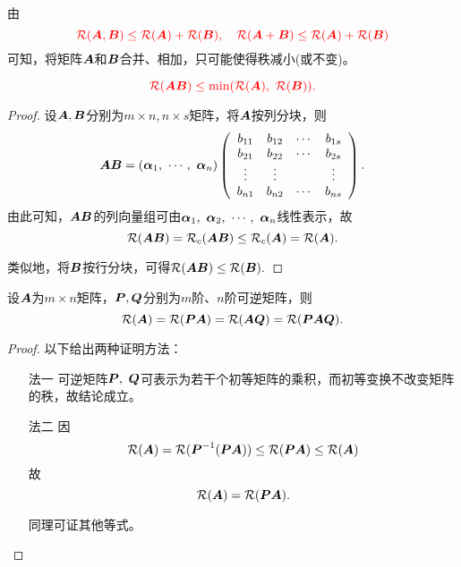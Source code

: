 \begin{frame}
\begin{zhu}
  由
  $$
  \red{\rank(\MA,\MB)\le \rank(\MA)+\rank(\MB), \quad
  \rank(\MA+\MB) \le \rank(\MA)+\rank(\MB)}
  $$
  可知，将矩阵$\MA$和$\MB$合并、相加，只可能使得秩减小(或不变)。
\end{zhu}

\end{frame}

\begin{frame}
\begin{xingzhi}
  $$
  \red{\rank(\MA\MB) \le \min(\rank(\MA),~\rank(\MB)).}
  $$
\end{xingzhi}
\pause 
\begin{proof}
设$\MA,\MB$分别为$m\times n, n\times s$矩阵，将$\MA$按列分块，则
$$
\MA\MB = (\alphabd_1,~\cd,~\alphabd_n) \left(
  \begin{array}{cccc}
    b_{11}&b_{12}&\cd&b_{1s}\\
    b_{21}&b_{22}&\cd&b_{2s}\\
    \vd&\vd&&\vd\\
    b_{n1}&b_{n2}&\cd&b_{ns}
  \end{array}
\right).
$$  
由此可知，$\MA\MB$的列向量组可由$\alphabd_1,~\alphabd_2,~\cd,~\alphabd_n$线性表示，故
$$
\rank(\MA\MB) = \rank_c(\MA\MB) \le \rank_c(\MA)= \rank(\MA).
$$ \pause 

类似地，将$\MB$按行分块，可得$\rank(\MA\MB)\le \rank(\MB).$
\end{proof}\pause 
{}
\end{frame}

\begin{frame}
\begin{xingzhi}
  设$\MA$为$m\times n$矩阵，$\MP,\MQ$分别为$m$阶、$n$阶可逆矩阵，则
  $$
  \rank(\MA) = \rank(\MP\MA) = \rank(\MA\MQ)  = \rank(\MP\MA\MQ).
  $$
\end{xingzhi}\pause 
\begin{proof}
  以下给出两种证明方法：
\begin{itemize}
\item[法一] 
  可逆矩阵$\MP,~\MQ$可表示为若干个初等矩阵的乘积，而初等变换不改变矩阵的秩，故结论成立。  \pause 
\item[法二]
  因
  $$
  \rank(\MA) = \rank(\MP^{-1}(\MP\MA)) \le \rank(\MP\MA) \le \rank(\MA)
  $$
  故
  $$
  \rank(\MA) = \rank(\MP\MA).
  $$
  
  同理可证其他等式。
\end{itemize}
\end{proof}
\end{frame}

